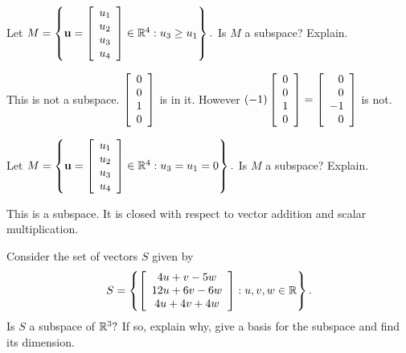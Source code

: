 \begin{enumialphparenastyle}
\begin{ex} Let $M=\left\{ {\bf u}=\left[ 
\begin{array}{c}
u_{1} \\
u_{2} \\
u_{3} \\
u_{4}
\end{array}
\right] \in 
\mathbb{R}^{4}:u_{3}\geq u_{1}\right\} .$ Is $M$ a subspace? Explain.
\begin{sol}
This
is not a subspace. $\left[ \begin{array}{r}
0 \\
0 \\
1 \\
0
\end{array}
\right] $ is in it. However $(-1) \left[ \begin{array}{r}
0 \\
0 \\
1 \\
0
\end{array}
\right]  = \left[ \begin{array}{r}
0 \\
0 \\
-1 \\
0
\end{array}
\right] $ is not.
\end{sol}
\end{ex}

\begin{ex} Let $M=\left\{ {\bf u}=\left[ 
\begin{array}{c}
u_{1} \\
u_{2} \\
u_{3} \\
u_{4}
\end{array}\right] \in 
\mathbb{R}^{4}:u_{3}=u_{1}=0\right\} .$ Is $M$ a subspace? Explain.
\begin{sol}
This is a subspace. It is closed with respect to vector addition and scalar
multiplication.
\end{sol}
\end{ex}

\begin{ex} Consider the set of vectors $S$ given by  
\begin{equation*}
S = 
\left\{ \left[
\begin{array}{c}
4u+v-5w \\ 
12u+6v-6w \\ 
4u+4v+4w
\end{array}
\right] :u,v,w\in \mathbb{R}\right\} .
\end{equation*}
Is $S$ a subspace of $\mathbb{R}^{3}?$ If so, explain why,
give a basis for the subspace and find its dimension.
\end{ex}


\end{enumialphparenastyle}
